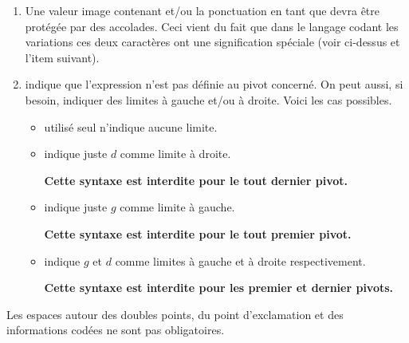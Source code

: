 \begin{enumerate}
\begin{itemize}
\begin{enumerate}
            \item Une valeur image contenant  et/ou la ponctuation \tdocinlatex{!} en tant que  devra être protégée par des accolades. Ceci vient du fait que dans le langage codant les variations ces deux caractères ont une signification spéciale (voir ci-dessus et l'item suivant).

            \item \tdocinlatex{!} indique que
l'expression n'est pas définie au pivot concerné.
            On peut aussi, si besoin, indiquer des limites à gauche et/ou à droite. Voici les cas possibles.
            \begin{itemize}
                \item \tdocinlatex{!} utilisé seul n'indique aucune limite.


                \item  {} indique juste $d$ comme limite à droite.

                \textbf{Cette syntaxe est interdite pour le tout dernier pivot.}


                \item {} indique juste $g$ comme limite à gauche.

                \textbf{Cette syntaxe est interdite pour le tout premier pivot.}


                \item  {} indique $g$ et $d$ comme limites à gauche et à droite respectivement.

                \textbf{Cette syntaxe est interdite pour les premier et dernier pivots.}
            \end{itemize}
        \end{enumerate}
    \end{itemize}
\end{enumerate}








\begin{tdocnote}
    Les espaces autour des doubles points, du point d'exclamation et des informations codées ne sont pas obligatoires.
\end{tdocnote}


